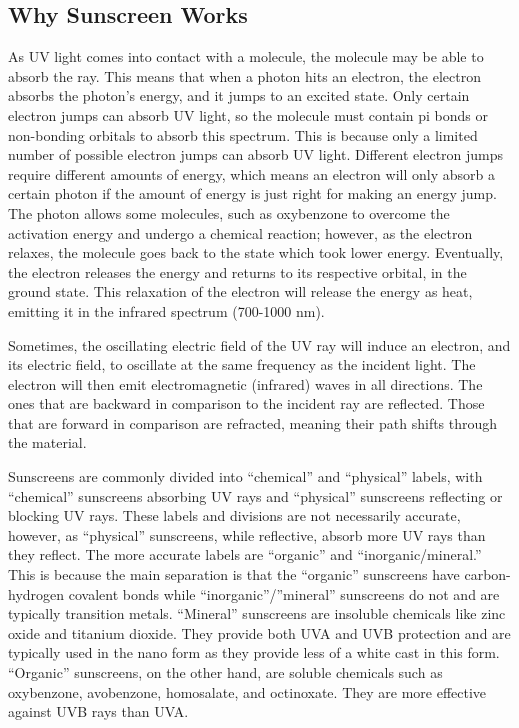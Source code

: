 \documentclass{article}
\begin{document}
\subsection{Why Sunscreen Works}
As UV light comes into contact with a molecule, the molecule may be able to absorb the ray. This means that when a photon hits an electron, the electron absorbs the photon’s energy, and it jumps to an excited state. Only certain electron jumps can absorb UV light, so the molecule must contain pi bonds or non-bonding orbitals to absorb this spectrum. This is because only a limited number of possible electron jumps can absorb UV light. Different electron jumps require different amounts of energy, which means an electron will only absorb a certain photon if the amount of energy is just right for making an energy jump. The photon allows some molecules, such as oxybenzone to overcome the activation energy and undergo a chemical reaction; however, as the electron relaxes, the molecule goes back to the state which took lower energy. Eventually, the electron releases the energy and returns to its respective orbital, in the ground state. This relaxation of the electron will release the energy as heat, emitting it in the infrared spectrum (700-1000 nm). 

Sometimes, the oscillating electric field of the UV ray will induce an electron, and its electric field,  to oscillate at the same frequency as the incident light. The electron will then emit electromagnetic (infrared) waves in all directions. The ones that are backward in comparison to the incident ray are reflected. Those that are forward in comparison are refracted, meaning their path shifts through the material.

Sunscreens are commonly divided into “chemical” and “physical” labels, with “chemical” sunscreens absorbing UV rays and “physical” sunscreens reflecting or blocking UV rays. These labels and divisions are not necessarily accurate, however, as “physical” sunscreens, while reflective, absorb more UV rays than they reflect. The more accurate labels are “organic” and “inorganic/mineral.” This is because the main separation is that the “organic” sunscreens have carbon-hydrogen covalent bonds while “inorganic”/”mineral” sunscreens do not and are typically transition metals. “Mineral” sunscreens are insoluble chemicals like zinc oxide and titanium dioxide. They provide both UVA and UVB protection and are typically used in the nano form as they provide less of a white cast in this form. “Organic” sunscreens, on the other hand, are soluble chemicals such as oxybenzone, avobenzone, homosalate, and octinoxate.  They are more effective against UVB rays than UVA.
        
\end{document}
